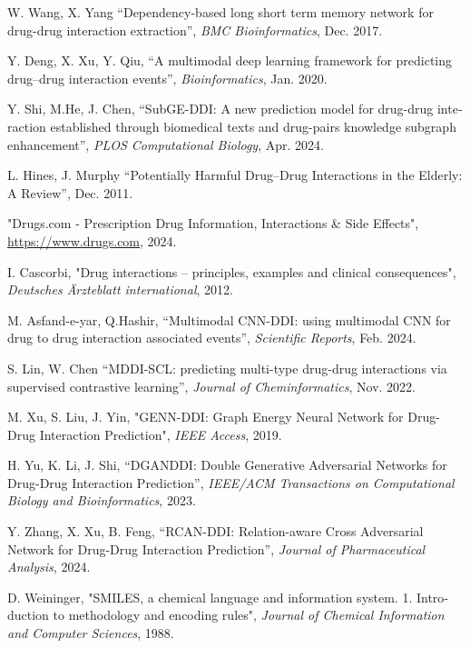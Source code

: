 \begin{thebibliography}{99}
\begin{latin}
W. Wang, X. Yang “Dependency-based long short term memory network for drug-drug interaction extraction”, \textit{BMC Bioinformatics}, Dec. 2017.

Y. Deng, X. Xu, Y. Qiu, “A multimodal deep learning framework for predicting drug–drug interaction events”, \textit{Bioinformatics}, Jan. 2020.

Y. Shi, M.He, J. Chen, “SubGE-DDI: A new prediction model for drug-drug interaction established through biomedical texts and drug-pairs knowledge subgraph enhancement”, \textit{PLOS Computational Biology}, Apr. 2024.

L. Hines, J. Murphy “Potentially Harmful Drug–Drug Interactions in the Elderly: A Review”, Dec. 2011.

"Drugs.com - Prescription Drug Information, Interactions \& Side Effects", \url{https://www.drugs.com}, 2024.

I. Cascorbi, "Drug interactions – principles, examples and clinical consequences", \textit{Deutsches Ärzteblatt international}, 2012.

M. Asfand-e-yar, Q.Hashir, “Multimodal CNN-DDI: using multimodal CNN for drug to drug interaction associated events”, \textit{Scientific Reports}, Feb. 2024.

S. Lin, W. Chen “MDDI-SCL: predicting multi-type drug-drug interactions via supervised contrastive learning”, \textit{Journal of Cheminformatics}, Nov. 2022.

M. Xu, S. Liu, J. Yin, "GENN-DDI: Graph Energy Neural Network for Drug-Drug Interaction Prediction", \textit{IEEE Access}, 2019.

H. Yu, K. Li, J. Shi, “DGANDDI: Double Generative Adversarial Networks for Drug-Drug Interaction Prediction”, \textit{IEEE/ACM Transactions on Computational Biology and Bioinformatics}, 2023.

Y. Zhang, X. Xu, B. Feng, “RCAN-DDI: Relation-aware Cross Adversarial Network for Drug-Drug Interaction Prediction”, \textit{Journal of Pharmaceutical Analysis}, 2024.

D. Weininger, "SMILES, a chemical language and information system. 1. Introduction to methodology and encoding rules", \textit{Journal of Chemical Information and Computer Sciences}, 1988.


\end{latin}
\end{thebibliography}
